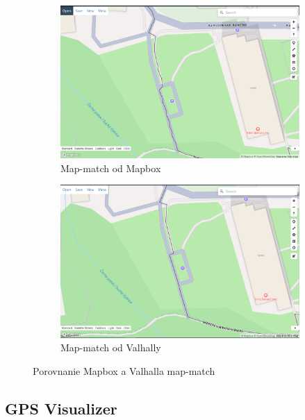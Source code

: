\begin{figure}[H]
  \centering
  \begin{subfigure}{.45\textwidth}
    \centering
    \includegraphics[width=1\textwidth]{img/porovnanie_map_match/mapbox-map-match.png}
    \caption{Map-match od Mapbox}
    \label{fig:mapbox-map-match}
  \end{subfigure}
  \begin{subfigure}{.45\textwidth}
    \centering
    \includegraphics[width=1\textwidth]{img/porovnanie_map_match/valhalla-map-match.png}
    \caption{Map-match od Valhally}
    \label{fig:valhalla-map-match}
  \end{subfigure}
  \caption{Porovnanie Mapbox a Valhalla map-match}
  \label{fig:mapbox-map-match-vs-valhalla}
\end{figure}

\subsection{GPS Visualizer}

